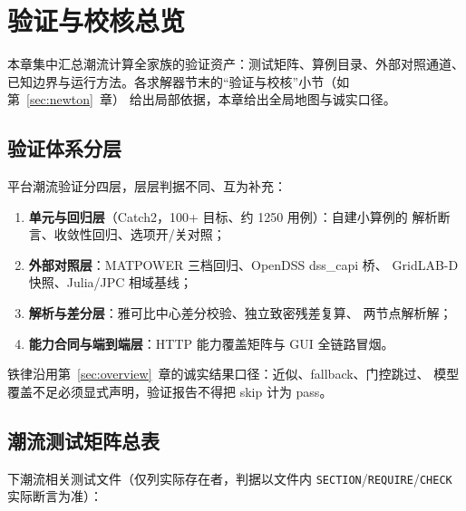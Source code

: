 \section{验证与校核总览}\label{sec:validation}

本章集中汇总潮流计算全家族的验证资产：测试矩阵、算例目录、外部对照通道、
已知边界与运行方法。各求解器节末的“验证与校核”小节（如第~\ref{sec:newton}~章）
给出局部依据，本章给出全局地图与诚实口径。

\subsection{验证体系分层}
平台潮流验证分四层，层层判据不同、互为补充：
\begin{enumerate}
  \item \textbf{单元与回归层}（Catch2，100+ 目标、约 1250 用例）：自建小算例的
        解析断言、收敛性回归、选项开/关对照；
  \item \textbf{外部对照层}：MATPOWER 三档回归、OpenDSS dss\_capi 桥、
        GridLAB-D 快照、Julia/JPC 相域基线；
  \item \textbf{解析与差分层}：雅可比中心差分校验、独立致密残差复算、
        两节点解析解；
  \item \textbf{能力合同与端到端层}：HTTP 能力覆盖矩阵与 GUI 全链路冒烟。
\end{enumerate}
铁律沿用第~\ref{sec:overview}~章的诚实结果口径：近似、fallback、门控跳过、
模型覆盖不足必须显式声明，验证报告不得把 skip 计为 pass。

\subsection{潮流测试矩阵总表}
 下潮流相关测试文件（仅列实际存在者，判据以文件内
\texttt{SECTION}/\texttt{REQUIRE}/\texttt{CHECK} 实际断言为准）：

